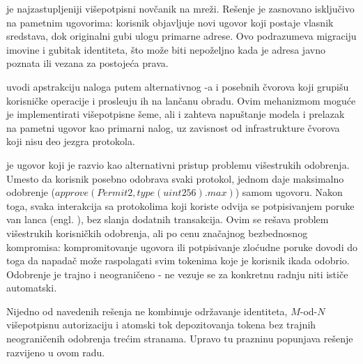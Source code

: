 \textbf{} \cite{gnosissafe2023} je najzastupljeniji vi\v sepotpisni nov\v canik na  mre\v zi. Re\v senje je zasnovano isklju\v civo na pametnim ugovorima: korisnik objavljuje novi ugovor koji postaje vlasnik sredstava, dok originalni  gubi ulogu primarne adrese. Ovo podrazumeva migraciju imovine i gubitak  identiteta, \v sto mo\v ze biti nepo\v zeljno kada je adresa javno poznata ili vezana za postoje\' ca prava.

\textbf{} \cite{eip4337} uvodi apstrakciju naloga putem alternativnog -a i posebnih  \v cvorova koji grupi\v su korisni\v cke operacije i prosle\dj uju ih na lan\v canu obradu. Ovim mehanizmom mogu\' ce je implementirati vi\v sepotpisne \v seme, ali i  zahteva napu\v stanje  modela i prelazak na pametni ugovor kao primarni nalog, uz zavisnost od infrastrukture  \v cvorova koji nisu deo jezgra  protokola.

\textbf{} \cite{permit2} je ugovor koji je razvio  \cite{uniswap2021} kao alternativni pristup problemu vi\v sestrukih  odobrenja. Umesto da korisnik posebno odobrava svaki  protokol, jednom daje maksimalno odobrenje \linebreak ($approve(Permit2, type(uint256).max)$) samom  ugovoru. Nakon toga, svaka interakcija sa protokolima koji koriste  odvija se potpisivanjem poruke van lanca (engl. ), bez slanja dodatnih transakcija. Ovim se re\v sava problem vi\v sestrukih korisni\v ckih odobrenja, ali po cenu zna\v cajnog bezbednosnog kompromisa: kompromitovanje  ugovora ili potpisivanje zlo\' cudne poruke dovodi do toga da napada\v c mo\v ze raspolagati svim tokenima koje je korisnik ikada odobrio. Odobrenje je trajno i neograni\v ceno - ne vezuje se za konkretnu radnju niti isti\v ce automatski.

Nijedno od navedenih re\v senja ne kombinuje odr\v zavanje  identiteta, $M$-od-$N$ vi\v sepotpisnu autorizaciju i atomski tok depozitovanja  tokena bez trajnih neograni\v cenih odobrenja tre\' cim stranama. Upravo tu prazninu popunjava re\v senje razvijeno u ovom radu.
